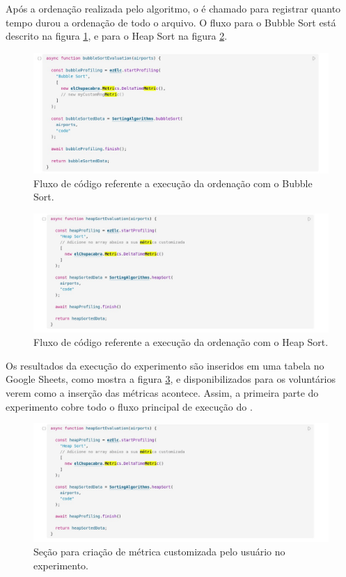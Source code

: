 \documentclass[12pt]{tcc}
\begin{document}
Após a ordenação realizada pelo algoritmo, o  é chamado para registrar quanto tempo durou a ordenação de todo o arquivo. O fluxo para o Bubble Sort está descrito na figura \ref{fig:experimento-bubble}, e para o Heap Sort na figura \ref{fig:experimento-heap}.

\begin{figure}[!ht]
	\centering
	\includegraphics[width=1\textwidth]{figures/experimento-bubble.jpeg}
	\caption{Fluxo de código referente a execução da ordenação com o Bubble Sort.}
	\label{fig:experimento-bubble}
\end{figure}

\begin{figure}[!ht]
	\centering
	\includegraphics[width=1\textwidth]{figures/experimento-heap.jpeg}
	\caption{Fluxo de código referente a execução da ordenação com o Heap Sort.}
	\label{fig:experimento-heap}
\end{figure}


Os resultados da execução do experimento são inseridos em uma tabela no Google Sheets, como mostra a figura \ref{fig:experimento-tabela-resultado}, e disponibilizados para os voluntários verem como a inserção das métricas acontece. Assim, a primeira parte do experimento cobre todo o fluxo principal de execução do .

\begin{figure}[!ht]
	\centering
	\includegraphics[width=1\textwidth]{figures/experimento-heap.jpeg}
	\caption{Seção para criação de métrica customizada pelo usuário no experimento.}
	\label{fig:experimento-tabela-resultado}
\end{figure}
\end{document}
